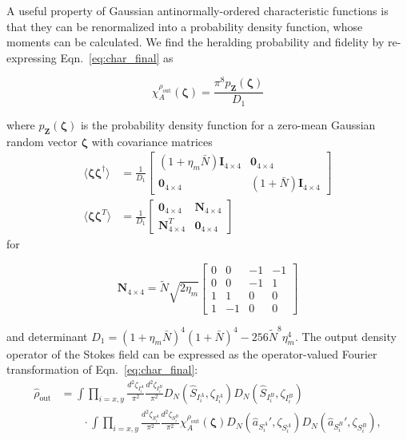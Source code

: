 \documentclass[aps,twocolumn,secnumarabic,amsmath,amssymb,pra,groupedaddress,
showpacs, showkeys]{revtex4-1}
\newcommand{\pna}[1]{\left(#1\right)}
\newcommand{\eqn}[1]{
\begin{equation}
	#1
\end{equation}
}
\begin{document}
A useful property of Gaussian antinormally-ordered characteristic functions is
that they can be renormalized into a probability density function, whose
moments can be calculated. We find the heralding probability and fidelity by
re-expressing Eqn.~\ref{eq:char_final} as
\eqn{
\chi_A^{\rho_{\textrm{out}}}\pna{\bm{\zeta}}=\frac{\pi^8 p_{\mathbf{Z}}\pna{\bm{\zeta}}}{D_1}
}
where $p_{\mathbf{Z}}\pna{\bm{\zeta}}$ is the probability density function for
a zero-mean Gaussian random vector $\bm{\zeta}$ with covariance matrices
\begin{align}
\langle \bm{\zeta}\bm{\zeta}^{\dagger}\rangle&=\frac{1}{D_1}\left[ 
\begin{array}{cc}
\pna{1+\eta_{m} \bar{N}} \mathbf{I}_{4\times 4} &  \mathbf{0}_{4\times 4} \\
 \mathbf{0}_{4\times 4} & \pna{1+\bar{N}} \mathbf{I}_{4\times 4}
\end{array} 
\right] \nonumber \\
\langle \bm{\zeta}\bm{\zeta}^{T}\rangle&=\frac{1}{D_1}\left[ 
\begin{array}{cc}
 \mathbf{0}_{4\times 4} & \mathbf{N}_{4\times 4} \\
 \mathbf{N}_{4\times 4}^T & \mathbf{0}_{4\times 4}
\end{array} 
\right]\label{eq:chap3:moments}
\end{align}
for 
\eqn{
\mathbf{N}_{4\times 4}=\tilde{N}\sqrt{2\eta_{m}}\left[ 
\begin{array}{cccc}
0 & 0 & -1 & -1\\
0 & 0 & -1 & 1\\
1 & 1 & 0 & 0\\
1 & -1 & 0 & 0
\end{array} 
\right]
}
and determinant $D_1=\pna{1+\eta_{m} \bar{N}}^4
\pna{1+\bar{N}}^4-256 \tilde{N}^8 \eta_{m}^4$. The output density
operator of the Stokes field can be expressed as the operator-valued Fourier
transformation of Eqn.~\ref{eq:char_final}:
\begin{align}
\hat{\rho}_{\textrm{out}}& =\int 
\prod_{i=x,y}
\frac{d^2 \zeta_{I_i^A}}{\pi^2} 
\frac{d^2 \zeta_{I_i^B}}{\pi^2} 
D_N\pna{\hat{S}_{I_i^A},\zeta_{I_i^A}} 
D_N\pna{\hat{S}_{I_i^B},\zeta_{I_i^B}}  \nonumber \\
& \qquad \cdot \int 
\prod_{i=x,y}
\frac{d^2 \zeta_{S_i^A}}{\pi^2} 
\frac{d^2 \zeta_{S_i^B}}{\pi^2}
\chi_A^{\rho_{\textrm{out}}}\pna{\bm{\zeta}} 
D_N\pna{\hat{a}_{S_i^A}',\zeta_{S_i^A}} 
D_N\pna{\hat{a}_{S_i^B}',\zeta_{S_i^B}},
\label{eq:fourier_char}
\end{align}
\end{document}
